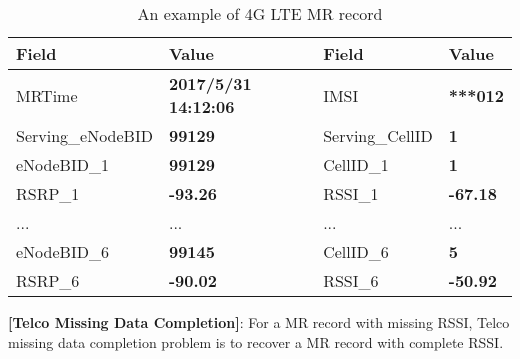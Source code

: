 \begin{table}\scriptsize
\caption{An example of 4G LTE MR record}\label{tab:mr}
  \centering
  \begin{tabular}{|l|l||l|l|}
  \hline
  \textbf{Field}    & \textbf{Value}                 & \textbf{Field}    & \textbf{Value}   \\ \hline \hline
  MRTime            & \textbf{2017/5/31 14:12:06}    & IMSI              & \textbf{***012}  \\ \hline
  Serving\_eNodeBID & \textbf{99129}                 & Serving\_CellID   & \textbf{1}       \\ \hline
  eNodeBID\_1       & \textbf{99129}                 & CellID\_1         & \textbf{1}       \\ \hline
  RSRP\_1           & \textbf{-93.26}                & RSSI\_1           & \textbf{-67.18}  \\ \hline
  ...               & ...                            & ...               & ...              \\ \hline
  eNodeBID\_6       & \textbf{99145}                 & CellID\_6         & \textbf{5}       \\ \hline
  RSRP\_6           & \textbf{-90.02}                & RSSI\_6           & \textbf{-50.92}  \\ \hline
  \end{tabular}
\end{table}

%



\begin{problem}\label{prob:miss}
  \textbf{[Telco Missing Data Completion]}: For a MR record with missing RSSI, Telco missing data completion problem is to recover a MR record with complete RSSI.
\end{problem}

